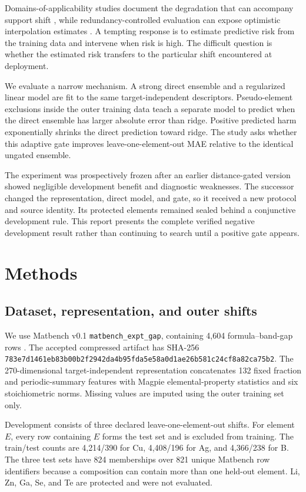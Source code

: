 \documentclass[11pt]{article}
\newcommand{\dataset}{\texttt{matbench\_expt\_gap}}
\begin{document}
Domains-of-applicability studies document the degradation that can accompany
support shift \citep{sutton2020domains}, while redundancy-controlled evaluation
can expose optimistic interpolation estimates \citep{li2024mdhit}. A tempting
response is to estimate predictive risk from the training data and intervene
when risk is high. The difficult question is whether the estimated risk
transfers to the particular shift encountered at deployment.

We evaluate a narrow mechanism. A strong direct ensemble and a regularized
linear model are fit to the same target-independent descriptors. Pseudo-element
exclusions inside the outer training data teach a separate model to predict when
the direct ensemble has larger absolute error than ridge. Positive predicted
harm exponentially shrinks the direct prediction toward ridge. The study asks
whether this adaptive gate improves leave-one-element-out MAE relative to the
identical ungated ensemble.

The experiment was prospectively frozen after an earlier distance-gated version
showed negligible development benefit and diagnostic weaknesses. The successor
changed the representation, direct model, and gate, so it received a new
protocol and source identity. Its protected elements remained sealed behind a
conjunctive development rule. This report presents the complete verified
negative development result rather than continuing to search until a positive
gate appears.

\section{Methods}
\subsection{Dataset, representation, and outer shifts}
We use Matbench v0.1 \dataset{}, containing 4,604 formula--band-gap rows
\citep{dunn2020matbench}. The accepted compressed artifact has SHA-256
\texttt{783e7d14\allowbreak{}61eb83b0\allowbreak{}0b2f2942\allowbreak{}da4b95fd\allowbreak{}a5e58a0d\allowbreak{}1ae26b58\allowbreak{}1c24cf8a\allowbreak{}82ca75b2}.
The 270-dimensional target-independent representation concatenates 132 fixed
fraction and periodic-summary features with Magpie elemental-property statistics
and six stoichiometric norms. Missing values are imputed using the outer
training set only.

Development consists of three declared leave-one-element-out shifts. For element
$E$, every row containing $E$ forms the test set and is excluded from training.
The train/test counts are 4,214/390 for Cu, 4,408/196 for Ag, and 4,366/238 for
B. The three test sets have 824 memberships over 821 unique Matbench row
identifiers because a composition can contain more than one held-out element.
Li, Zn, Ga, Se, and Te are protected and were not evaluated.
\end{document}

